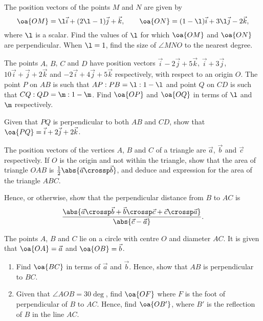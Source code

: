 \begin{problem}
    The position vectors of the points $M$ and $N$ are given by \[\oa{OM} = \l \vec i + (2\l - 1) \vec j + \vec k, \qquad \oa{ON} = (1-\l) \vec i + 3\l \vec j - 2 \vec k,\] where $\l$ is a scalar. Find the values of $\l$ for which $\oa{OM}$ and $\oa{ON}$ are perpendicular. When $\l = 1$, find the size of $\angle MNO$ to the nearest degree.
\end{problem}

\begin{problem}
    The points $A$, $B$, $C$ and $D$ have position vectors $\vec i - 2\vec j + 5\vec k$, $\vec i + 3\vec j$, $10\vec i + \vec j + 2\vec k$ and $-2\vec i + 4\vec j + 5\vec k$ respectively, with respect to an origin $O$. The point $P$ on $AB$ is such that $AP : PB = \l : 1 - \l$ and point $Q$ on $CD$ is such that $CQ : QD = \m : 1 - \m$. Find $\oa{OP}$ and $\oa{OQ}$ in terms of $\l$ and $\m$ respectively.

    Given that $PQ$ is perpendicular to both $AB$ and $CD$, show that $\oa{PQ} = \vec i + 2\vec j + 2\vec k$.
\end{problem}

\begin{problem}
    The position vectors of the vertices $A$, $B$ and $C$ of a triangle are $\vec a$, $\vec b$ and $\vec c$ respectively. If $O$ is the origin and not within the triangle, show that the area of triangle $OAB$ is $\frac12 \abs{\vec a \crossp \vec b}$, and deduce and expression for the area of the triangle $ABC$.

    Hence, or otherwise, show that the perpendicular distance from $B$ to $AC$ is \[\frac{\abs{\vec a \crossp \vec b + \vec b \crossp \vec c + \vec c \crossp \vec a}}{\abs{\vec c - \vec a}}.\]
\end{problem}

\begin{problem}[\chili]
    The points $A$, $B$ and $C$ lie on a circle with centre $O$ and diameter $AC$. It is given that $\oa{OA} = \vec a$ and $\oa{OB} = \vec b$.

    \begin{enumerate}
        \item Find $\oa{BC}$ in terms of $\vec a$ and $\vec b$. Hence, show that $AB$ is perpendicular to $BC$.
        \item Given that $\angle AOB = 30\deg$, find $\oa{OF}$ where $F$ is the foot of perpendicular of $B$ to $AC$. Hence, find $\oa{OB'}$, where $B'$ is the reflection of $B$ in the line $AC$.
    \end{enumerate}
\end{problem}